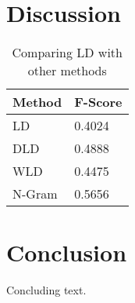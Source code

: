\documentclass[11pt]{article}
\begin{document}
\section{Discussion}

\begin{table}[h]
\begin{center}
\begin{tabular}{| l | l |}

      \hline
      Method & F-Score \\
      \hline\hline
      LD & 0.4024 \\
      DLD & 0.4888 \\
      WLD & 0.4475 \\
      N-Gram &  0.5656 \\
      \hline
\end{tabular}

\caption{Comparing LD with other methods}\label{table5}
\end{center}
\end{table}


\section{Conclusion}

Concluding text.



\end{document}
